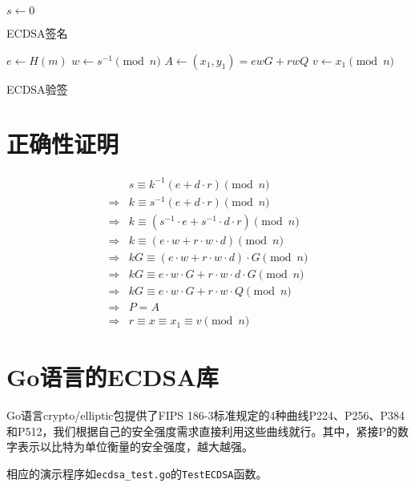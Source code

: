 \documentclass[a4paper,10pt]{article}
\begin{document}
\begin{adjustbox}{left=0.45\linewidth,minipage=0.45\linewidth,valign=T}
  \begin{algorithm}[H]
    \DontPrintSemicolon

    \BlankLine

    \(s\leftarrow 0\)\;

    \caption{ECDSA签名}\label{algo-sign}
  \end{algorithm}
\end{adjustbox}  
\begin{adjustbox}{left=0.45\linewidth,minipage=0.45\linewidth,valign=T}
  \begin{algorithm}[H]
    \DontPrintSemicolon

    \BlankLine

    \(e\leftarrow H(m)\)\;
    \(w\leftarrow s^{-1}\pmod{n}\)\;
    \(A\leftarrow (x_1,y_1)=ewG+rwQ\)\;
    \(v\leftarrow x_1\pmod{n}\)\;

    \caption{ECDSA验签}\label{algo-verify}
  \end{algorithm}
\end{adjustbox}  

\section{正确性证明}
\[
  \begin{aligned}  
    &s \equiv k^{-1}(e+d\cdot r)\pmod{n} \\
    \Rightarrow &k \equiv s^{-1}(e+d\cdot r)\pmod{n} \\
    \Rightarrow &k \equiv (s^{-1}\cdot e+s^{-1}\cdot d\cdot r)\pmod{n} \\
    \Rightarrow &k \equiv (e\cdot w+r\cdot w\cdot d)\pmod{n} \\
    \Rightarrow &kG \equiv (e\cdot w+r\cdot w\cdot d)\cdot G\pmod{n} \\
    \Rightarrow &kG \equiv e\cdot w\cdot G +r\cdot w\cdot d\cdot G \pmod{n} \\
    \Rightarrow &kG \equiv e\cdot w\cdot G +r\cdot w\cdot Q \pmod{n} \\
    \Rightarrow &P=A \\
    \Rightarrow &r\equiv x\equiv x_1\equiv v\pmod{n}
  \end{aligned}  
\]

\section{Go语言的ECDSA库}
Go语言crypto/elliptic包提供了FIPS 186-3标准规定的4种曲线P224、P256、P384和P512，我们根据自己的安全强度需求直接利用这些曲线就行。其中，紧接P的数字表示以比特为单位衡量的安全强度，越大越强。

相应的演示程序如\lstinline!ecdsa_test.go!的\lstinline!TestECDSA!函数。
\end{document}

